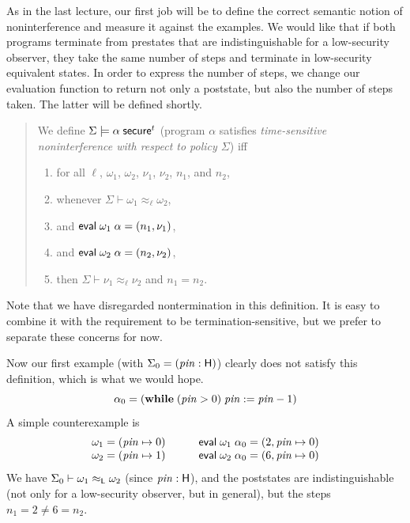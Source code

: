 \documentclass[11pt]{article}
\newcommand{\tm}{t}
\begin{document}
As in the last lecture, our first job will be to define the correct semantic
notion of noninterference and measure it against the examples.  We would like
that if both programs terminate from prestates that are indistinguishable for a
low-security observer, they take the same number of steps and terminate in
low-security equivalent states.  In order to express the number of steps, we
change our evaluation function to return not only a poststate, but also the
number of steps taken.  The latter will be defined shortly.
\begin{quote}
  We define $\Sigma \models \alpha\; \ms{secure}^\tm$ (program $\alpha$
  satisfies \emph{time-sensitive noninterference with respect to policy
    $\Sigma$}) \newline iff
  \begin{enumerate}[]
  \item for all $\ell$, $\omega_1$, $\omega_2$, $\nu_1$, $\nu_2$, $n_1$, and $n_2$,
  \item whenever $\Sigma \vdash \omega_1 \approx_\ell \omega_2$,
  \item and $\mathsf{eval}\; \omega_1\; \alpha = (n_1, \nu_1)$,
  \item and $\mathsf{eval}\; \omega_2\; \alpha = (n_2, \nu_2)$,
  \item then $\Sigma \vdash \nu_1 \approx_\ell \nu_2$ and $n_1 = n_2$.
  \end{enumerate}
\end{quote}
Note that we have disregarded nontermination in this definition.  It is easy to
combine it with the requirement to be termination-sensitive, but we prefer to
separate these concerns for now.

Now our first example (with $\Sigma_0 = (\mathit{pin} : \mathsf{H})$) clearly does not
satisfy this definition, which is what we would hope.
\[
  \alpha_0 = (\mathbf{while}\; (\mathit{pin} > 0)\; \mathit{pin} := \mathit{pin} - 1)
\]
A simple counterexample is
\[
  \begin{array}{l@{\hspace{3em}}l}
    \omega_1 = (\mi{pin} \mapsto 0) & \eval\; \omega_1\; \alpha_0 = (2, \mi{pin} \mapsto 0) \\
    \omega_2 = (\mi{pin} \mapsto 1) & \eval\; \omega_2\; \alpha_0 = (6, \mi{pin} \mapsto 0)
  \end{array}
\]
We have $\Sigma_0 \vdash \omega_1 \approx_{\mathsf{L}} \omega_2$ (since
$\mathit{pin} : \mathsf{H}$), and the poststates are indistinguishable (not only for a
low-security observer, but in general), but the steps $n_1 = 2 \neq 6 = n_2$.
\end{document}
